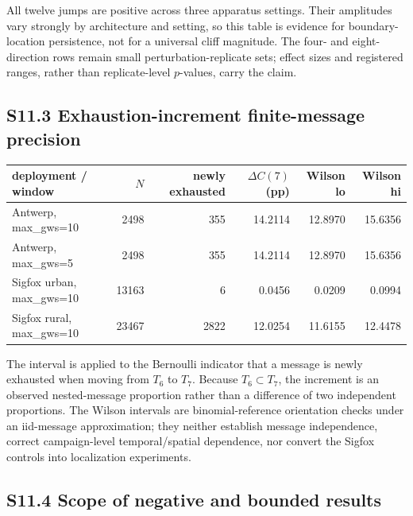 \documentclass[journal,onecolumn,10pt]{IEEEtran}
\begin{document}
All twelve jumps are positive across three apparatus settings. Their amplitudes vary strongly by architecture and setting, so this table is evidence for boundary-location persistence, not for a universal cliff magnitude. The four- and eight-direction rows remain small perturbation-replicate sets; effect sizes and registered ranges, rather than replicate-level $p$-values, carry the claim.

\subsection*{S11.3 Exhaustion-increment finite-message precision}

\begingroup\footnotesize
\begin{center}\begin{minipage}{\textwidth}\centering
{}

\begin{tabular}{@{}p{}rrrrr@{}}
\toprule\noalign{}
deployment / window & $N$ & newly exhausted & $\Delta C(7)$ (pp) & Wilson lo & Wilson hi \\
\midrule\noalign{}

Antwerp, max\_gws=10 & 2498 & 355 & 14.2114 & 12.8970 & 15.6356 \\
Antwerp, max\_gws=5 & 2498 & 355 & 14.2114 & 12.8970 & 15.6356 \\
Sigfox urban, max\_gws=10 & 13163 & 6 & 0.0456 & 0.0209 & 0.0994 \\
Sigfox rural, max\_gws=10 & 23467 & 2822 & 12.0254 & 11.6155 & 12.4478 \\
\bottomrule
\end{tabular}
\end{minipage}\end{center}
\endgroup

The interval is applied to the Bernoulli indicator that a message is newly exhausted when moving from $T_6$ to $T_7$. Because $T_6\subset T_7$, the increment is an observed nested-message proportion rather than a difference of two independent proportions. The Wilson intervals are binomial-reference orientation checks under an iid-message approximation; they neither establish message independence, correct campaign-level temporal/spatial dependence, nor convert the Sigfox controls into localization experiments.

\subsection*{S11.4 Scope of negative and bounded results}
\end{document}
